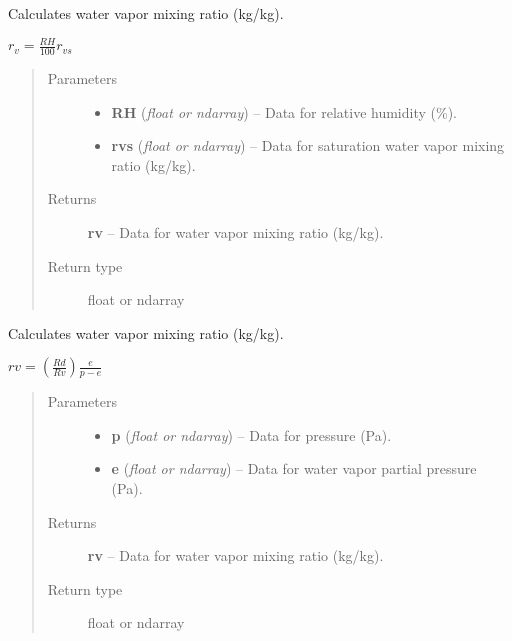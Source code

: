 \documentclass[letterpaper,10pt,english]{sphinxmanual}
\begin{document}

\begin{fulllineitems}
\label{atmos:atmos.equations.rv_from_RH_rvs}
Calculates water vapor mixing ratio (kg/kg).

\(r_v = \frac{RH}{100} r_{vs}\)
\begin{quote}\begin{description}
\item[{Parameters}] \leavevmode\begin{itemize}
\item {} 
\textbf{RH} (\emph{float or ndarray}) -- Data for relative humidity (\%).

\item {} 
\textbf{rvs} (\emph{float or ndarray}) -- Data for saturation water vapor mixing ratio (kg/kg).

\end{itemize}

\item[{Returns}] \leavevmode
\textbf{rv} --
Data for water vapor mixing ratio (kg/kg).

\item[{Return type}] \leavevmode
float or ndarray

\end{description}\end{quote}

\end{fulllineitems}


\begin{fulllineitems}
\label{atmos:atmos.equations.rv_from_p_e}
Calculates water vapor mixing ratio (kg/kg).

\(rv = (\frac{Rd}{Rv}) \frac{e}{p-e}\)
\begin{quote}\begin{description}
\item[{Parameters}] \leavevmode\begin{itemize}
\item {} 
\textbf{p} (\emph{float or ndarray}) -- Data for pressure (Pa).

\item {} 
\textbf{e} (\emph{float or ndarray}) -- Data for water vapor partial pressure (Pa).

\end{itemize}

\item[{Returns}] \leavevmode
\textbf{rv} --
Data for water vapor mixing ratio (kg/kg).

\item[{Return type}] \leavevmode
float or ndarray

\end{description}\end{quote}

\end{fulllineitems}
\end{document}
